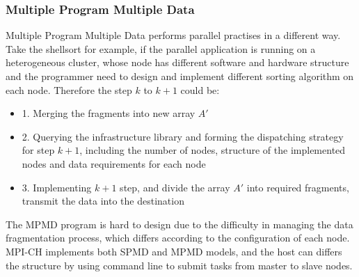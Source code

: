 \documentclass[11pt,openright,a4paper]{report}
\begin{document}
\subsubsection{Multiple Program Multiple Data}
Multiple Program Multiple Data performs parallel practises in a different way. Take the shellsort for example, if the parallel application is running on a heterogeneous cluster, whose node has different software and hardware structure and the programmer need to design and implement different sorting algorithm on each node. Therefore the step $k$ to $k+1$ could be:
\begin{itemize}
	\item{1.} Merging the fragments into new array ${A}'$
    \item{2.} Querying the infrastructure library and forming the dispatching strategy for step $k+1$, including the number of nodes, structure of the implemented nodes and data requirements for each node
    \item{3.} Implementing $k+1$ step, and divide the array ${A}'$ into required fragments, transmit the data into the destination
\end{itemize}
The MPMD program is hard to design due to the difficulty in managing the data fragmentation process, which differs according to the configuration of each node.\\
MPI-CH implements both SPMD and MPMD models, and the host can differs the structure by using command line to submit tasks from master to slave nodes.
\end{document}
